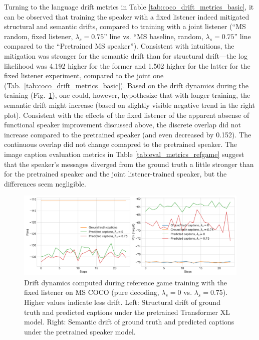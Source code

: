 Turning to the language drift metrics in Table \ref{tab:coco_drift_metrics_basic}, it can be observed that training the speaker with a fixed listener indeed mitigated structural and semantic drifts, compared to training with a joint listener (``MS random, fixed listener, $\lambda_s=0.75$'' line vs. ``MS baseline, random, $\lambda_s=0.75$'' line compared to the ``Pretrained MS speaker''). Consistent with intuitions, the mitigation was stronger for the semantic drift than for structural drift---the log likelihood was 4.192 higher for the former and 1.502 higher for the latter for the fixed listener experiment, compared to the joint one (Tab.~\ref{tab:coco_drift_metrics_basic}). Based on the drift dynamics during the training (Fig.~\ref{fig:coco_fixed_listener_075_str_sem_drift}), one could, however, hypothesize that with longer training, the semantic drift might increase (based on slightly visible negative trend in the right plot). Consistent with the effects of the fixed listener of the apparent absense of functional speaker improvement discussed above, the discrete overlap did not increase compared to the pretrained speaker (and even decreased by 0.152). The continuous overlap did not change comapred to the pretrained speaker. The image caption evaluation metrics in Table \ref{tab:eval_metrics_refgame} suggest that the speaker's messages diverged from the ground truth a little stronger than for the pretrained speaker and the joint listener-trained speaker, but the differences seem negligible.
\begin{figure}
	\centering
	\includegraphics[width=\linewidth]{images/coco_fixedListener_structural_semantic_drift_4000_pure_0_075_random.png}
	\caption{Drift dynamics computed during reference game training with the fixed listener on MS COCO (pure decoding, $\lambda_s=0$ vs. $\lambda_s=0.75$). Higher values indicate less drift. Left: Structural drift of ground truth and predicted captions under the pretrained Transformer XL model. Right: Semantic drift of ground truth and predicted captions under the pretrained speaker model.}
	\label{fig:coco_fixed_listener_075_str_sem_drift}
\end{figure}

